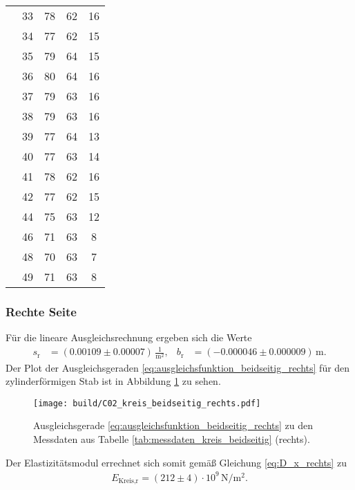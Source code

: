 \begin{table}[H]
\begin{tabular}[]{S S[table-format = 2.0] S S S[table-format = 2.0]}
                 & 33 & 78 & 62 & 16 \\
                 & 34 & 77 & 62 & 15 \\
                 & 35 & 79 & 64 & 15 \\
                 & 36 & 80 & 64 & 16 \\
                 & 37 & 79 & 63 & 16 \\
                 & 38 & 79 & 63 & 16 \\
                 & 39 & 77 & 64 & 13 \\
                 & 40 & 77 & 63 & 14 \\
                 & 41 & 78 & 62 & 16 \\
                 & 42 & 77 & 62 & 15 \\
                 & 44 & 75 & 63 & 12 \\
                 & 46 & 71 & 63 &  8 \\
                 & 48 & 70 & 63 &  7 \\
                 & 49 & 71 & 63 &  8 \\
        \bottomrule
    \end{tabular}
\end{table}

\subsubsection{Rechte Seite}
Für die lineare Ausgleichsrechnung ergeben sich die Werte
\begin{align*}
    s_\text{r} &= (\num{0.00109} \pm \num{0.00007}) \, \frac{1}{\unit{\meter^2}}, & 
    b_\text{r} &= (\num{-0.000046} \pm \num{0.000009}) \, \unit{\meter}.
\end{align*}
Der Plot der Ausgleichsgeraden \eqref{eq:ausgleichsfunktion_beidseitig_rechts} für den zylinderförmigen Stab
ist in Abbildung \ref{fig:plot_kreis_beidseitig_rechts} zu sehen.
%
\begin{figure}[H]
    \centering
    \texttt{[image: build/C02\_kreis\_beidseitig\_rechts.pdf]}
    \caption{Ausgleichsgerade \eqref{eq:ausgleichsfunktion_beidseitig_rechts} zu den Messdaten aus Tabelle \ref{tab:messdaten_kreis_beidseitig} (rechts).}
    \label{fig:plot_kreis_beidseitig_rechts}
\end{figure}

\noindent
Der Elastizitätsmodul errechnet sich somit gemäß Gleichung \eqref{eq:D_x_rechts} zu
\begin{align}
    E_\text{Kreis,r} = (\num{212} \pm \num{4}) \cdot 10^9 \, \unit{\newton\per\meter^2}.
\end{align}




